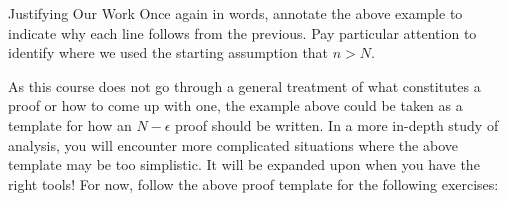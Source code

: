 \begin{exercise}{Justifying Our Work \Coffeecup}
Once again in words, annotate the above example to indicate why each line follows from the previous.  Pay particular attention to identify where we used the starting assumption that $n>N$.
\end{exercise}

As this course does not go through a general treatment of what constitutes a proof or how to come up with one, the example above could be taken as a template for how an $N-\epsilon$ proof should be written.  In a more in-depth study of analysis, you will encounter more complicated situations where the above template may be too simplistic.  It will be expanded upon when you have the right tools!  For now, follow the above proof template for the following exercises:

